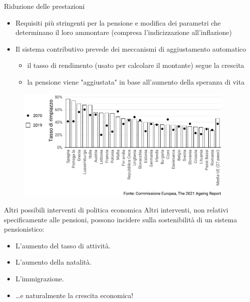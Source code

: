 \documentclass[aspectratio=64,12pt]{beamer}
\begin{document}
\begin{frame}{Riduzione delle prestazioni}
\begin{itemize}
\item Requisiti più stringenti per la pensione e modifica dei parametri che
determinano il loro ammontare (compresa l'indicizzazione all'inflazione)
\item Il sistema contributivo prevede dei meccanismi di aggiustamento automatico
\begin{itemize}
\item il tasso di rendimento (usato per calcolare il montante) segue la crescita
\item la pensione viene "aggiustata" in base all'aumento della speranza di vita
\end{itemize}
\end{itemize}

\begin{figure}[htbp]
\centering
\includegraphics[height=5.5cm]{./figure/tassi-rimpiazzo-2019-2070.pdf}
\end{figure}
\end{frame}

\begin{frame}{Altri possibili interventi di politica economica}
Altri interventi, non relativi specificamente alle pensioni, possono incidere sulla sostenibilità di un sistema pensionistico: 
\begin{itemize}
\item L'aumento del tasso di attività.
\item L'aumento della natalità.
\item L'immigrazione.
\item \ldots{}e naturalmente la crescita economica!
\end{itemize}
\end{frame}
\end{document}
